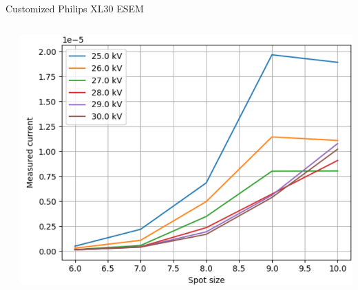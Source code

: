 \documentclass[final]{beamer}
\begin{document}
\begin{frame}[fragile]{}
\begin{columns}[T]
\begin{column}{.49\linewidth}
\begin{block}{\Large Customized Philips XL30 ESEM}
\begin{columns}
\begin{column}{0.225\columnwidth}
			\end{column}
			\begin{column}{0.45\columnwidth}
				\includegraphics[width=\columnwidth]{./figures/beamcurrents.png}
			\end{column}
		\end{columns}
	\end{block}



\end{column}
\end{columns}
\end{frame}
\end{document}
